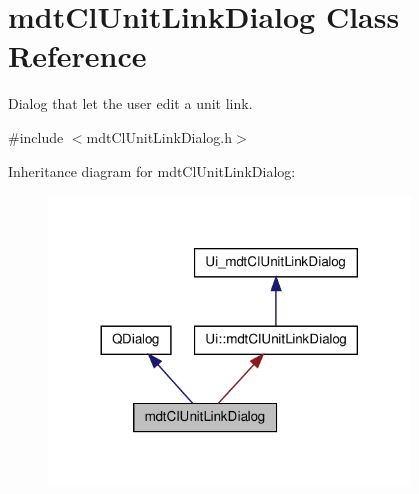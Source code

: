 \hypertarget{classmdt_cl_unit_link_dialog}{\section{mdt\-Cl\-Unit\-Link\-Dialog Class Reference}
\label{classmdt_cl_unit_link_dialog}
}


Dialog that let the user edit a unit link.  




{\ttfamily \#include $<$mdt\-Cl\-Unit\-Link\-Dialog.\-h$>$}



Inheritance diagram for mdt\-Cl\-Unit\-Link\-Dialog\-:
\nopagebreak
\begin{figure}[H]
\begin{center}
\leavevmode
\includegraphics[width=272pt]{classmdt_cl_unit_link_dialog__inherit__graph}
\end{center}
\end{figure}


